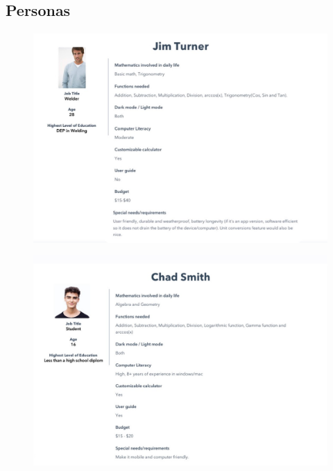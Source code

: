         \subsection{Personas}
                \begin{figure}[!htb]
                    \centering
                    \includegraphics{images/Jim-Turner.JPG}
                \end{figure}
            \begin{figure}[!htb]
                \centering
                \includegraphics{images/Chad-Smith.JPG}
            \end{figure}

